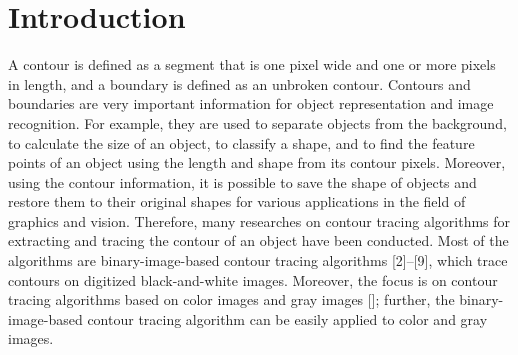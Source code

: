 
\section{Introduction}

A contour is defined as a segment that is one pixel wide and one or more pixels in length, and a boundary is defined as an unbroken contour\cite{Mcqueen2004Contour}. Contours and boundaries are very important information for object representation and image recognition. For example, they are used to separate objects from the background, to calculate the size of an object, to classify a shape, and to find the feature points of an object using the length and shape from its contour pixels\cite{Pratt????Digital,Gose1996Pattern}. Moreover, using the contour information, it is possible to save the shape of objects and restore them to their original shapes for various applications in the field of graphics and vision. Therefore, many researches on contour tracing algorithms for extracting and tracing the contour of an object have been conducted. Most of the algorithms are binary-image-based contour tracing algorithms [2]–[9], which trace contours on digitized black-and-white images. Moreover, the focus is on contour tracing algorithms based on color images and gray images []; further, the binary-image-based contour tracing algorithm can be easily applied to color and gray images.